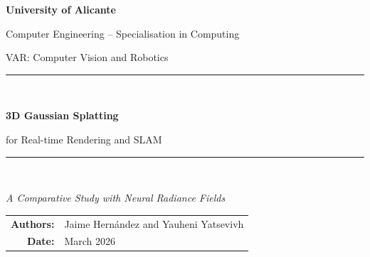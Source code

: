 \documentclass[12pt,a4paper]{article}
\begin{document}
\begin{titlepage}
  \centering
  \vspace*{2cm}
  {\Large\bfseries University of Alicante\par}
  \vspace{0.5cm}
  {\large Computer Engineering -- Specialisation in Computing\par}
  {\large VAR: Computer Vision and Robotics\par}
  \vspace{3cm}
  \rule{\linewidth}{0.4pt}\\[0.4cm]
  {\Huge\bfseries 3D Gaussian Splatting\par}
  {\Large for Real-time Rendering and SLAM\par}
  \vspace{0.2cm}
  \rule{\linewidth}{0.4pt}\\[1cm]
  {\large\itshape A Comparative Study with Neural Radiance Fields\par}
  \vfill
  \begin{tabular}{rl}
    \textbf{Authors:}   & Jaime Hernández and Yauheni Yatsevivh \\
    \textbf{Date:}     & March 2026    \\
  \end{tabular}
  \vspace{2cm}
\end{titlepage}

\tableofcontents
\newpage
















\newpage


\end{document}

